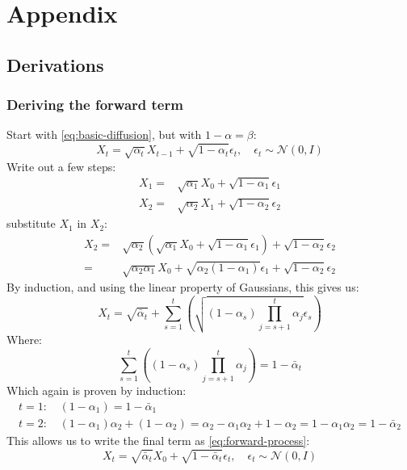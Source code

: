 \chapter{Appendix}

\section{Derivations}

\subsection{Deriving the forward term} \label{ap:forward-term}
Start with \cref{eq:basic-diffusion}, but with $1-\alpha = \beta$:
\begin{equation}
    X_t = \sqrt{\alpha_t} X_{t-1} + \sqrt{1-\alpha_t} \epsilon_t, \quad \epsilon_t \sim \mathcal{N}(0,I)
\end{equation}
Write out a few steps:
\begin{align}
    X_1 =& \sqrt{\alpha_1} X_0 + \sqrt{1-\alpha_1} \epsilon_1 \\
    X_2 =& \sqrt{\alpha_2} X_1 + \sqrt{1-\alpha_2} \epsilon_2
\end{align}
substitute $X_1$ in $X_2$:
\begin{align}
    X_2 =& \sqrt{\alpha_2} (\sqrt{\alpha_1} X_0 + \sqrt{1-\alpha_1} \epsilon_1) + \sqrt{1-\alpha_2} \epsilon_2 \\
    =& \sqrt{\alpha_2 \alpha_1} X_0  + \sqrt{\alpha_2(1-\alpha_1)} \epsilon_1 + \sqrt{1-\alpha_2} \epsilon_2
\end{align}
By induction, and using the linear property of Gaussians, this gives us:
\begin{equation}
    X_t = \sqrt{\bar{\alpha}_t} + \sum_{s=1}^{t}\left( \sqrt{(1 - \alpha_s) \prod_{j=s+1}^{t}\alpha_j} \epsilon_s \right)
\end{equation}
Where:
\begin{equation}
    \sum_{s=1}^{t}\left((1 - \alpha_s) \prod_{j=s+1}^{t}\alpha_j \right) = 1 - \bar{\alpha}_t
\end{equation}
Which again is proven by induction:
\begin{align}
    t=1 \text{: }& (1 - \alpha_1) = 1 - \bar{\alpha}_1 \\
    t=2 \text{: }& (1 - \alpha_1) \alpha_2 + (1 - \alpha_2) = \alpha_2 - \alpha_1 \alpha_2  + 1 - \alpha_2 = 1 - \alpha_1 \alpha_2 =  1 - \bar{\alpha}_2
\end{align}
This allows us to write the final term as \cref{eq:forward-process}:
\begin{equation} 
    X_t = \sqrt{\bar{\alpha}_t}X_0+\sqrt{1-\bar{\alpha}_t} \epsilon_t, \quad \epsilon_t \sim \mathcal{N}(0,I)
\end{equation}

